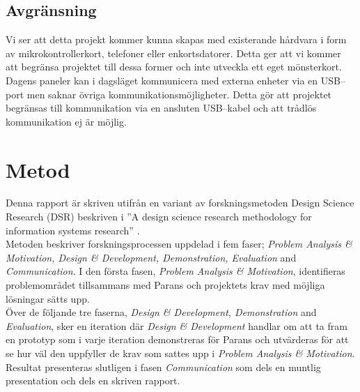 \documentclass{article}
\begin{document}

        \subsection{Avgränsning} %
        \label{sub:avgransning}
            Vi ser att detta projekt kommer kunna skapas med existerande hårdvara i form av mikrokontrollerkort, telefoner eller enkortsdatorer. Detta ger att vi kommer att begränsa projektet till dessa former och inte utveckla ett eget mönsterkort.\\

            \noindent Dagens paneler kan i dagsläget kommunicera med externa enheter via en USB--port men saknar övriga kommunikationsmöjligheter. Detta gör att projektet begränsas till kommunikation via en ansluten USB--kabel och att trådlös kommunikation ej är möjlig.

    \section{Metod} %
    \label{sec:metod}

        Denna rapport är skriven utifrån en variant av forskningsmetoden Design Science Research (DSR) beskriven i 
        ''A design science research methodology for information systems research'' \cite{method}. \\

        \noindent Metoden beskriver forskningsprocessen uppdelad i fem faser; 
        \textit{Problem Analysis \& Motivation, Design \& Development, Demonstration, Evaluation} and \textit{Communication}. 
        I den första fasen, \textit{Problem Analysis \& Motivation}, identifieras problemområdet tillsammans med Parans och projektets krav med möjliga lösningar sätts upp.\\

        \noindent Över de följande tre faserna, \textit{Design \& Development, Demonstration} and \textit{Evaluation}, sker en iteration där \textit{Design \& Development} handlar om att ta fram en prototyp som i varje iteration demonstreras för Parans och utvärderas för att se hur väl den uppfyller de krav som sattes upp i \textit{Problem Analysis \& Motivation}.\\
        Resultat presenteras slutligen i fasen \textit{Communication} som dels en muntlig presentation och dels en skriven rapport. \\
\end{document}
